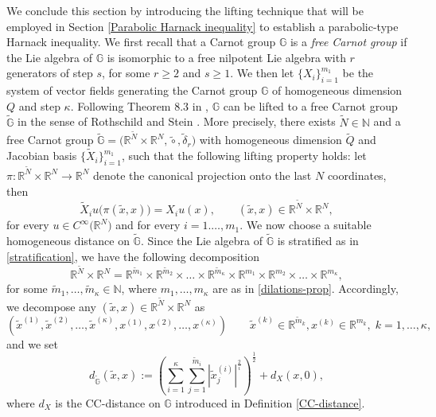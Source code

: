 \documentclass[11pt,a4paper]{article}
\numberwithin{equation}{section}
\newcommand{\R}{\mathbb{R}}
\newcommand{\N}{\mathbb{N}}
\def \rn {{\mathbb {R}}^{N}}
\def \rnm {{\mathbb {R}}^{\tilde N}}
\def \tt {\tilde}
\def \GG {{\mathbb{G}}}
\def \ti {\times}
\def \d {{\delta}}
\begin{document}
\medskip


We conclude this section by introducing the lifting technique that will be employed in Section \ref{Parabolic Harnack inequality} to establish a parabolic-type Harnack inequality.  We first recall that a Carnot group $\GG$ is a \textit{free Carnot group} if the Lie algebra of $\GG$ is isomorphic to a free nilpotent Lie algebra with $r$ generators of step $s$, for some $r \geq 2$ and $s \geq 1$. We then let $\{X_i\}_{i=1}^{m_1}$ be the system of vector fields generating the Carnot group $\GG$ of  homogeneous dimension $Q$  and step $\kappa$. Following Theorem 8.3 in \cite{bonfiglioli2002uniform}, $\GG$ can be lifted to a free Carnot group $\tt \GG$ in the sense of Rothschild and Stein \cite{rothschild1976hypoelliptic}. More precisely, there exists $\tilde{N}\in \N$ and a free Carnot group $\tilde{\GG}=\big(\rnm\times \rn,\tt \circ,\tt \d_r\big)$ with homogeneous dimension $\tt Q$ and Jacobian basis $\big\{\tilde X_i\big\}_{i=1}^{m_1}$, such that the following lifting property holds: let $\pi : \mathbb{R}^{\tt N} \times \mathbb{R}^{{N}} \to \mathbb{R}^N$ denote the canonical projection onto the last $N$ coordinates, then 
\begin{equation}\label{lifting}
	\tt X_i u\big(\pi(\tt x, x)\big) = X_i u(x),\qquad (\tt x, x) \in \rnm \times \rn,
\end{equation}
for every $u \in C^\infty\big(\mathbb{R}^N\big)$ and for every $i=1.\ldots,m_1$. We now choose a suitable homogeneous distance on  $\tilde \GG$. Since the Lie algebra of $\tt\GG$ is stratified as in \eqref{stratification}, we have the following decomposition 
\begin{equation}
	\rnm\times \rn = \R^{\tt m_1}\ti\R^{\tt m_2}\ti\ldots\ti \R^{\tt m_\kappa}\ti\R^{m_1}\ti\R^{m_2}\ti\ldots\ti \R^{m_\kappa},
\end{equation}
for some $\tt m_1,\ldots,\tt m_\kappa \in \N$, where $ m_1,\ldots, m_\kappa$ are as in \eqref{dilations-prop}. Accordingly, we decompose any $(\tt x, x)\in\rnm \times\rn$ as
\begin{equation}
	\left(	\tt x^{(1)},\tt x ^{(2)},\ldots,\tt x^{(\kappa)}, x^{(1)},x ^{(2)},\ldots, x^{(\kappa)}\right) \qquad \tt x^{(k)}\in \R^{\tt m_k}, x^{(k)}\in \R^{m_k}, \; k=1,\ldots,\kappa,
\end{equation}
and we set
\begin{equation}\label{tilde-distance}
	d_{\tt \GG}(\tt x,x) := \left(\sum_{i=1}^\kappa \sum_{j=1}^{\tt m_i} |\tt x_j^{(i)}|^{\frac{2}{i}}\right)^{\frac{1}{2}} \!\!+ d_X(x,0), 
\end{equation} 
where $d_X$ is the CC-distance on $\GG$ introduced in Definition \ref{CC-distance}. 
\end{document}
